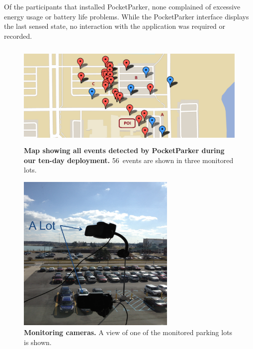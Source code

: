 Of the participants that installed PocketParker, none complained of excessive
energy usage or battery life problems. While the PocketParker interface
displays the last sensed state, no interaction with the application was
required or recorded.

\begin{figure}
\centering
\includegraphics[width=\textwidth,height=2in]{./figures/detectedEventsOnMap.pdf}

\caption{\textbf{Map showing all events detected by PocketParker during our
ten-day deployment.} 56~events are shown in three monitored lots.}

\label{fig-events}
\end{figure}

\begin{figure}
\centering
\includegraphics[width=3.0in]{./figures/Camera_setting.pdf}

\caption{\textbf{Monitoring cameras.} A view of one of the monitored parking
lots is shown.}

\label{fig-camera}
\end{figure}
